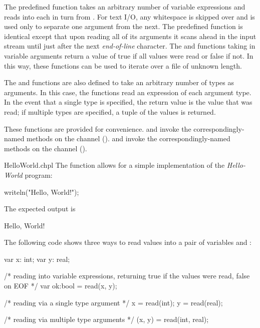 The predefined function  takes an arbitrary number of
variable expressions and reads into each in turn from .
For text I/O, any whitespace is skipped over and is used only to separate one
argument from the next.  The predefined function  is
identical except that upon reading all of its arguments it scans ahead
in the input stream until just after the next {\em end-of-line}
character. The  and  functions taking in variable
arguments return a  value of true if all values were read or
false if not. In this way, these functions can be used to iterate over a file
of unknown length.

The  and  functions are also defined to take
an arbitrary number of types as arguments.  In this case, the
functions read an expression of each argument type.  In the event that
a single type is specified, the return value is the value that was
read; if multiple types are specified, a tuple of the values is
returned.

These functions are provided for convenience.
 and  invoke the correspondingly-named methods
on the  channel ().
 and  invoke the correspondingly-named methods
on the  channel ().

\begin{chapelexample}{HelloWorld.chpl}
The  function allows for a simple implementation
of the {\em Hello-World} program:
\begin{chapel}
writeln("Hello, World!");
\end{chapel}
The expected output is
\begin{chapelprintoutput}{}
Hello, World!
\end{chapelprintoutput}
\end{chapelexample}

\begin{example}
The following code shows three ways to read values into a pair of
variables  and :
\begin{chapel}
var x: int;
var y: real;

/* reading into variable expressions, returning
   true if the values were read, false on EOF */
var ok:bool = read(x, y);

/* reading via a single type argument */
x = read(int);
y = read(real);

/* reading via multiple type arguments */
(x, y) = read(int, real);
\end{chapel}
\end{example}


